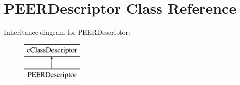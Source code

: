 \hypertarget{classPEERDescriptor}{}\section{P\+E\+E\+R\+Descriptor Class Reference}
\label{classPEERDescriptor}
Inheritance diagram for P\+E\+E\+R\+Descriptor\+:\begin{figure}[H]
\begin{center}
\leavevmode
\includegraphics[height=2.000000cm]{classPEERDescriptor}
\end{center}
\end{figure}
